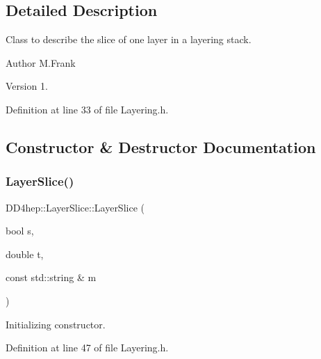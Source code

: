 \subsection{Detailed Description}
Class to describe the slice of one layer in a layering stack. 

\begin{DoxyAuthor}{Author}
M.\+Frank 
\end{DoxyAuthor}
\begin{DoxyVersion}{Version}
1. 
\end{DoxyVersion}


Definition at line 33 of file Layering.\+h.



\subsection{Constructor \& Destructor Documentation}
\hypertarget{class_d_d4hep_1_1_layer_slice_ae70daa0af493afe9ff51032df8f1a5ca}{}\label{class_d_d4hep_1_1_layer_slice_ae70daa0af493afe9ff51032df8f1a5ca} 
\subsubsection{\texorpdfstring{Layer\+Slice()}{LayerSlice()}\hspace{0.1cm}{\footnotesize\ttfamily [1/2]}}
{\footnotesize\ttfamily D\+D4hep\+::\+Layer\+Slice\+::\+Layer\+Slice (\begin{DoxyParamCaption}\item[{bool}]{s,  }\item[{double}]{t,  }\item[{const std\+::string \&}]{m }\end{DoxyParamCaption})\hspace{0.3cm}{\ttfamily [inline]}}



Initializing constructor. 



Definition at line 47 of file Layering.\+h.

\hypertarget{class_d_d4hep_1_1_layer_slice_a9701e10d9e18e708c9f2664149e764fa}{}\label{class_d_d4hep_1_1_layer_slice_a9701e10d9e18e708c9f2664149e764fa} 
